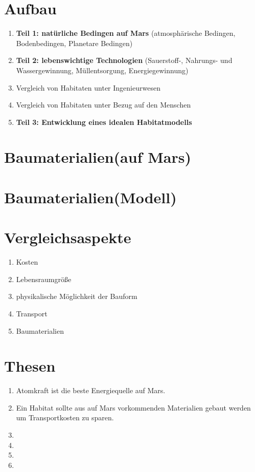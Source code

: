 \documentclass[12pt]{article}
\begin{document}
\section{\textbf{Aufbau}}
\begin{enumerate}
  \item \textbf{Teil 1: natürliche Bedingen auf Mars} (atmosphärische Bedingen, Bodenbedingen, Planetare Bedingen)
  \item \textbf{Teil 2: lebenswichtige Technologien} (Sauerstoff-, Nahrungs- und Wassergewinnung, Müllentsorgung, Energiegewinnung)
  \item Vergleich von Habitaten unter Ingenieurwesen
  \item Vergleich von Habitaten unter Bezug auf den Menschen
  \item \textbf{Teil 3: Entwicklung eines idealen Habitatmodells}
\end{enumerate}

\medskip

\section{\textbf{Baumaterialien}(auf Mars)} %

\medskip

\section{\textbf{Baumaterialien}(Modell)} %

\newpage

\section{\textbf{Vergleichsaspekte}}
\begin{enumerate}
  \item Kosten
  \item Lebensraumgröße
  \item physikalische Möglichkeit der Bauform
  \item Transport
  \item Baumaterialien
\end{enumerate}

\medskip

\section{\textbf{Thesen}} %
\begin{enumerate}
  \item Atomkraft ist die beste Energiequelle auf Mars.
  \item Ein Habitat sollte aus auf Mars vorkommenden Materialien gebaut werden um Transportkosten zu sparen. \cite{rabbithole2010a}
  \item %
  \item %
  \item %
  \item %
\end{enumerate}
\end{document}
